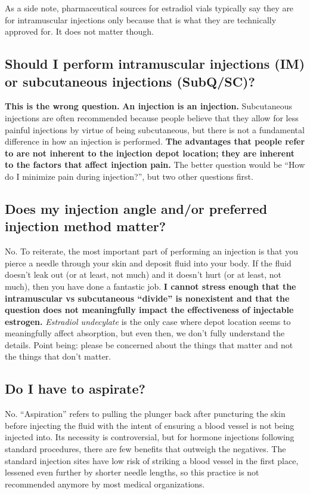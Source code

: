 \documentclass{article}
\begin{document}
As a side note, pharmaceutical sources for estradiol vials typically say they are for intramuscular injections only because that is what they are technically approved for. It does not matter though.

\subsection{Should I perform intramuscular injections (IM) or subcutaneous injections (SubQ/SC)?}

\textbf{This is the wrong question.} \textbf{An injection is an injection.} Subcutaneous injections are often recommended because people believe that they allow for less painful injections by virtue of being subcutaneous, but there is not a fundamental difference in how an injection is performed. \textbf{The advantages that people refer to are not inherent to the injection depot location; they are inherent to the factors that affect injection pain.} The better question would be “How do I minimize pain during injection?”, but two other questions first.

\subsection{Does my injection angle and/or preferred injection method matter?}

No. To reiterate, the most important part of performing an injection is that you pierce a needle through your skin and deposit fluid into your body. If the fluid doesn’t leak out (or at least, not much) and it doesn’t hurt (or at least, not much), then you have done a fantastic job. \textbf{I cannot stress enough that the intramuscular vs subcutaneous “divide” is nonexistent and that the question does not meaningfully impact the effectiveness of injectable estrogen.} \textit{Estradiol undecylate} is the only case where depot location seems to meaningfully affect absorption, but even then, we don’t fully understand the details. Point being: please be concerned about the things that matter and not the things that don’t matter.

\subsection{Do I have to aspirate?}

No. “Aspiration” refers to pulling the plunger back after puncturing the skin before injecting the fluid with the intent of ensuring a blood vessel is not being injected into. Its necessity is controversial, but for hormone injections following standard procedures, there are few benefits that outweigh the negatives. The standard injection sites have low risk of striking a blood vessel in the first place, lessened even further by shorter needle lengths, so this practice is not recommended anymore by most medical organizations.
\end{document}
